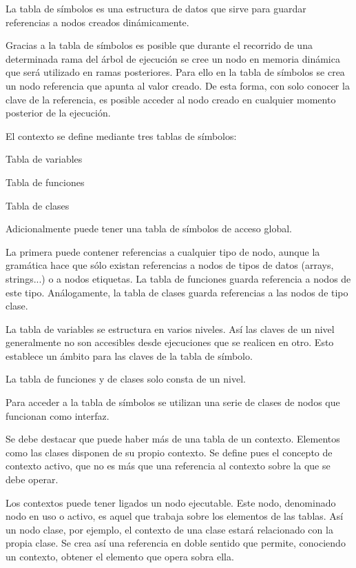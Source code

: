 La tabla de símbolos es una estructura de datos que sirve para guardar referencias a nodos creados dinámicamente.

Gracias a la tabla de símbolos es posible que durante el recorrido de una determinada rama del árbol de ejecución se cree un nodo en memoria dinámica que será utilizado en ramas posteriores. Para ello en la tabla de símbolos se crea un nodo referencia que apunta al valor creado. De esta forma, con solo conocer la clave de la referencia, es posible acceder al nodo creado en cualquier momento posterior de la ejecución.

El contexto se define mediante tres tablas de símbolos\-:


\begin{DoxyItemize}
\item Tabla de variables
\item Tabla de funciones
\item Tabla de clases
\end{DoxyItemize}

Adicionalmente puede tener una tabla de símbolos de acceso global.

La primera puede contener referencias a cualquier tipo de nodo, aunque la gramática hace que sólo existan referencias a nodos de tipos de datos (arrays, strings...) o a nodos etiquetas. La tabla de funciones guarda referencia a nodos de este tipo. Análogamente, la tabla de clases guarda referencias a las nodos de tipo clase.

La tabla de variables se estructura en varios niveles. Así las claves de un nivel generalmente no son accesibles desde ejecuciones que se realicen en otro. Esto establece un ámbito para las claves de la tabla de símbolo.

La tabla de funciones y de clases solo consta de un nivel.

Para acceder a la tabla de símbolos se utilizan una serie de clases de nodos que funcionan como interfaz.

Se debe destacar que puede haber más de una tabla de un contexto. Elementos como las clases disponen de su propio contexto. Se define pues el concepto de contexto activo, que no es más que una referencia al contexto sobre la que se debe operar.

Los contextos puede tener ligados un nodo ejecutable. Este nodo, denominado nodo en uso o activo, es aquel que trabaja sobre los elementos de las tablas. Así un nodo clase, por ejemplo, el contexto de una clase estará relacionado con la propia clase. Se crea así una referencia en doble sentido que permite, conociendo un contexto, obtener el elemento que opera sobra ella.

